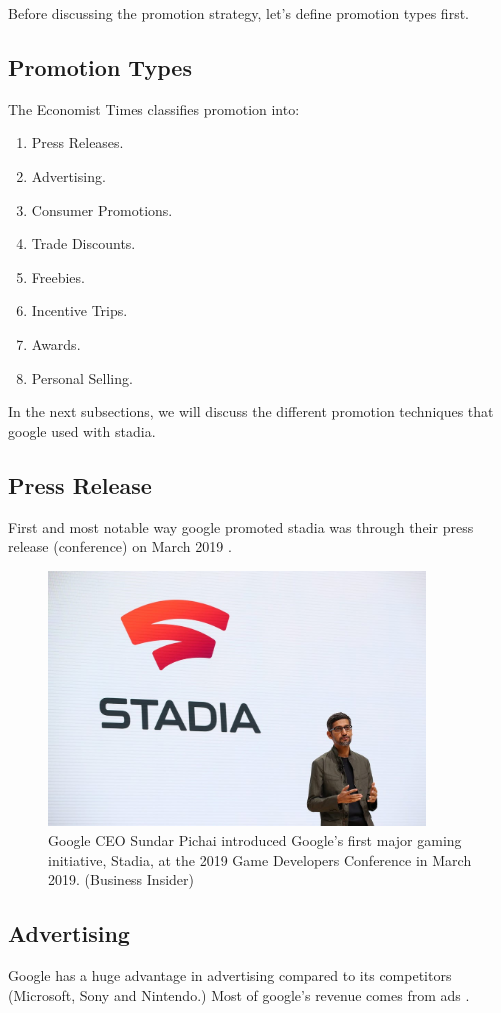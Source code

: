Before discussing the promotion strategy, let's define promotion types first.

\subsection{Promotion Types}
The Economist Times classifies \cite{promoTypes} promotion into:
\begin{enumerate}
    \item Press Releases.
    \item Advertising.
    \item Consumer Promotions.
    \item Trade Discounts.
    \item Freebies.
    \item Incentive Trips.
    \item Awards.
    \item Personal Selling.
\end{enumerate}
In the next subsections, we will discuss the different promotion techniques that google used with stadia.

\subsection{Press Release}
First and most notable way google promoted stadia was through their press release (conference) on March 2019 \cite{press}.

\begin{figure}[H]
    \centering
    \includegraphics[width=10cm]{images/release.jpeg}
    \caption{Google CEO Sundar Pichai introduced Google's first major gaming initiative, Stadia, at the 2019 Game Developers Conference in March 2019. (Business Insider) \cite{businessInsiderCon}}
\end{figure}

\subsection{Advertising}
Google has a huge advantage in advertising compared to its competitors (Microsoft, Sony and Nintendo.)
Most of google's revenue comes from ads \cite{googleRevenue}. 

